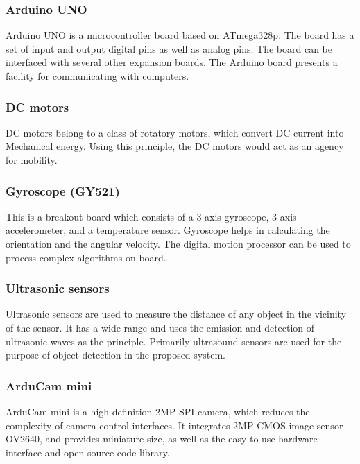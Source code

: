 \documentclass[journal]{IEEEtran}
\begin{document}
\subsubsection{Arduino UNO}
Arduino UNO is a microcontroller board based on ATmega328p.
The board has a set of input and output digital pins as
well as analog pins. The board can be interfaced with
several other expansion boards. The Arduino board presents
a facility for communicating with computers.
\subsubsection{DC motors}
DC motors belong to a class of rotatory motors, which convert
DC current into Mechanical energy. Using this principle, the
DC motors would act as an agency for mobility.
\subsubsection{Gyroscope (GY521)}
This is a breakout board which consists of a 3 axis gyroscope,
3 axis accelerometer, and a temperature sensor. Gyroscope
helps in calculating the orientation and the angular velocity.
The digital motion processor can be used to process complex
algorithms on board.
\subsubsection{Ultrasonic sensors}
Ultrasonic sensors are used to measure the distance of any
object in the vicinity of the sensor. It has a wide range
and uses the emission and detection of ultrasonic waves as
the principle. Primarily ultrasound sensors are used for
the purpose of object detection in the proposed system.
\subsubsection{ArduCam mini}
ArduCam mini is a high definition 2MP SPI camera, which
reduces the complexity of camera control interfaces.
It integrates 2MP CMOS image sensor OV2640, and provides
miniature size, as well as the easy to use hardware
interface and open source code library.
\end{document}
